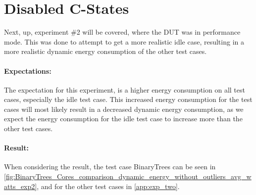 \section{Disabled C-States}

Next, up, experiment \#2 will be covered, where the DUT was in performance mode. This was done to attempt to get a more realistic idle case, resulting in a more realistic dynamic energy consumption of the other test cases.

\paragraph*{Expectations:} The expectation for this experiment, is a higher energy consumption on all test cases, especially the idle test case. This increased energy consumption for the test cases will most likely result in a decreased dynamic energy consumption, as we expect the energy consumption for the idle test case to increase more than the other test cases.

\paragraph*{Result:} When considering the result, the test case BinaryTrees can be seen in \cref{fig:BinaryTrees_Cores_comparison_dynamic_energy_without_outliers_avg_watts_exp2}, and for the other test cases in \cref{app:exp_two}.




